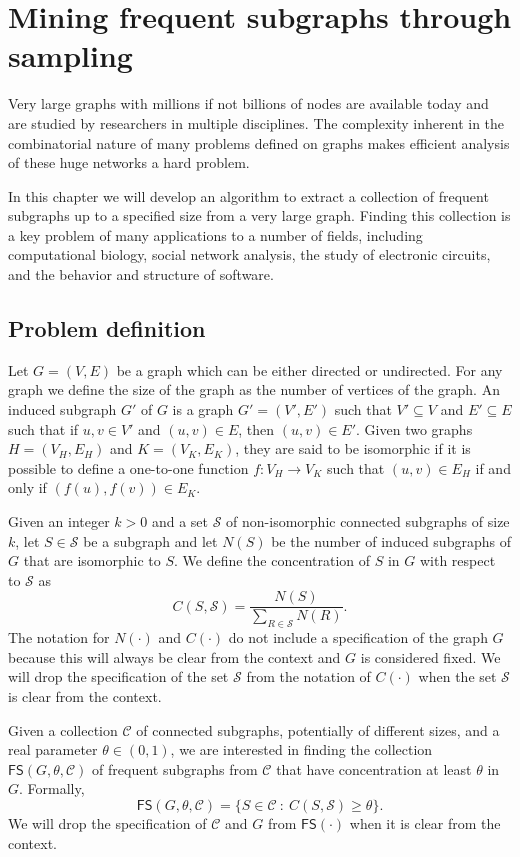\chapter{Mining frequent subgraphs through sampling}\label{ch:graphmine}
Very large graphs with millions if not billions of nodes are available today and
are studied by researchers in multiple disciplines.
The complexity inherent in the combinatorial nature of many problems defined on
graphs makes efficient analysis of these huge networks a hard problem. 

In this chapter we will develop an algorithm to extract a collection of frequent
subgraphs up to a specified size from a very large graph. Finding this
collection is a key problem of many applications to a number of fields, including
computational biology, social network analysis, the study of electronic
circuits, and the behavior and structure of software.

\section{Problem definition}\label{sec:graphminesettings}
Let $G=(V,E)$ be a graph which can be either directed or
undirected. For any graph we define the size of the graph as the number of
vertices of the graph. An induced subgraph $G'$ of $G$  is a graph $G'=(V',E')$
such that $V'\subseteq V$ and $E'\subseteq E$ such that if $u,v\in V'$ and
$(u,v)\in E$, then $(u,v)\in E'$. Given two graphs $H=(V_H,E_H)$ and
$K=(V_K,E_K)$, they are said to be isomorphic if it is possible to define a
one-to-one function $f:V_H\rightarrow V_K$ such that $(u,v)\in E_H$ if and only
if $(f(u),f(v))\in E_K$.

Given an integer $k>0$ and a set $\mathcal{S}$ of
non-isomorphic connected subgraphs of size $k$, let $S\in\mathcal{S}$ be a
subgraph and let $N(S)$ be the number of induced subgraphs of $G$ that are
isomorphic to $S$. We define the concentration of $S$ in $G$ with respect to
$\mathcal{S}$ as
\[
C(S,\mathcal{S})=\frac{N(S)}{\sum_{R\in\mathcal{S}}N(R)}.\]
The notation for $N(\cdot)$ and $C(\cdot)$ do not include a specification of the
graph $G$ because this will always be clear from the context and $G$ is
considered fixed. We will drop the specification of the set $\mathcal{S}$ from
the notation of $C(\cdot)$ when the set $\mathcal{S}$ is clear from the context.

Given a collection $\mathcal{C}$ of connected subgraphs, potentially of
different sizes, and a real parameter $\theta\in(0,1)$, we are interested in
finding the collection $\mathsf{FS}(G,\theta,\mathcal{C})$ of frequent subgraphs from
$\mathcal{C}$ that have concentration at least $\theta$ in $G$. Formally,
\[
\mathsf{FS}(G,\theta,\mathcal{C})=\{S\in\mathcal{C} ~:~ C(S,\mathcal{S})\ge\theta\}.\]
We will drop the specification of $\mathcal{C}$ and $G$ from $\mathsf{FS}(\cdot)$ when
it is clear from the context.

